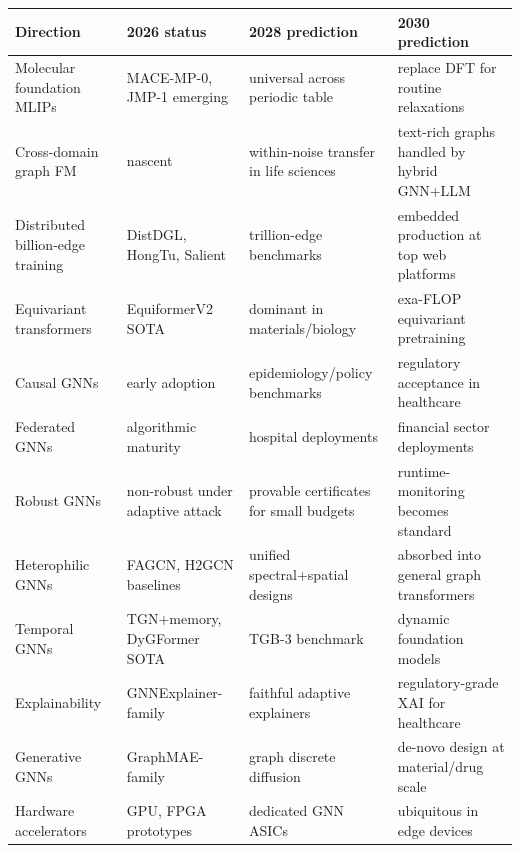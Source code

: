{\def\LTcaptype{none} %
\begin{longtable}[]{@{}
  >{\raggedright\arraybackslash}p{}
  >{\raggedright\arraybackslash}p{}
  >{\raggedright\arraybackslash}p{}
  >{\raggedright\arraybackslash}p{}@{}}
\toprule\noalign{}
\begin{minipage}[b]{\linewidth}\raggedright
Direction
\end{minipage} & \begin{minipage}[b]{\linewidth}\raggedright
2026 status
\end{minipage} & \begin{minipage}[b]{\linewidth}\raggedright
2028 prediction
\end{minipage} & \begin{minipage}[b]{\linewidth}\raggedright
2030 prediction
\end{minipage} \\
\midrule\noalign{}
\endhead
\bottomrule\noalign{}
\endlastfoot
Molecular foundation MLIPs & MACE-MP-0, JMP-1 emerging & universal across periodic table & replace DFT for routine relaxations \\
Cross-domain graph FM & nascent & within-noise transfer in life sciences & text-rich graphs handled by hybrid GNN+LLM \\
Distributed billion-edge training & DistDGL, HongTu, Salient & trillion-edge benchmarks & embedded production at top web platforms \\
Equivariant transformers & EquiformerV2 SOTA & dominant in materials/biology & exa-FLOP equivariant pretraining \\
Causal GNNs & early adoption & epidemiology/policy benchmarks & regulatory acceptance in healthcare \\
Federated GNNs & algorithmic maturity & hospital deployments & financial sector deployments \\
Robust GNNs & non-robust under adaptive attack & provable certificates for small budgets & runtime-monitoring becomes standard \\
Heterophilic GNNs & FAGCN, H2GCN baselines & unified spectral+spatial designs & absorbed into general graph transformers \\
Temporal GNNs & TGN+memory, DyGFormer SOTA & TGB-3 benchmark & dynamic foundation models \\
Explainability & GNNExplainer-family & faithful adaptive explainers & regulatory-grade XAI for healthcare \\
Generative GNNs & GraphMAE-family & graph discrete diffusion & de-novo design at material/drug scale \\
Hardware accelerators & GPU, FPGA prototypes & dedicated GNN ASICs & ubiquitous in edge devices \\
\end{longtable}
}

